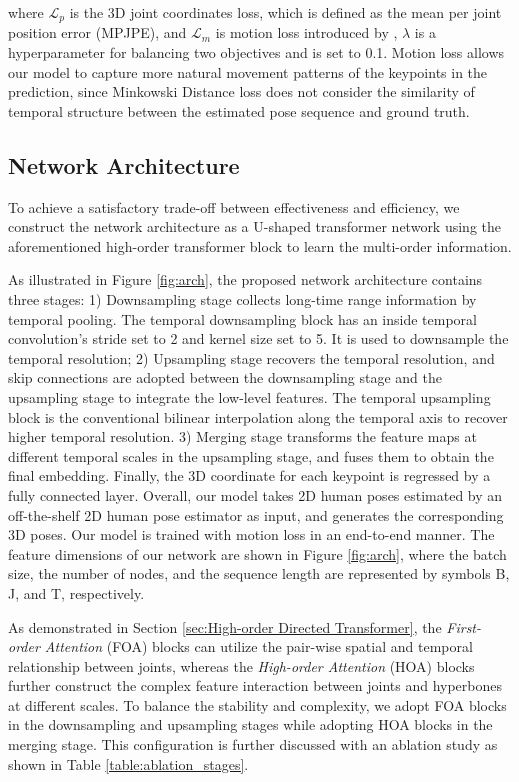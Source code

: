 \documentclass{article}
\begin{document}
\noindent where $\mathcal{L}_p$ is the 3D joint coordinates loss, which is defined as the mean per joint position error (MPJPE), and $\mathcal{L}_m$ is motion loss introduced by \cite{wang2020-motion}, $\lambda$ is a hyperparameter for balancing two objectives and is set to 0.1. Motion loss allows our model to capture more natural movement patterns of the keypoints in the prediction, since Minkowski Distance loss does not consider the similarity of temporal structure between the estimated pose sequence and ground truth. 



\subsection{Network Architecture}
To achieve a satisfactory trade-off between effectiveness and efficiency, we construct the network architecture as a U-shaped transformer network using the aforementioned high-order transformer block to learn the multi-order information. 

As illustrated in Figure \ref{fig:arch}, the proposed network architecture contains three stages: 1) Downsampling stage collects long-time range information by temporal pooling. The temporal downsampling block has an inside temporal convolution’s stride set to 2 and kernel size set to 5. It is used to downsample the temporal resolution; 2) Upsampling stage recovers the temporal resolution, and skip connections are adopted between the downsampling stage and the upsampling stage to integrate the low-level features. The temporal upsampling block is the conventional bilinear interpolation along the temporal axis to recover higher temporal resolution. 3) Merging stage transforms the feature maps at different temporal scales in the upsampling stage, and fuses them to obtain the final embedding. Finally, the 3D coordinate for each keypoint is regressed by a fully connected layer. Overall, our model takes 2D human poses estimated by an off-the-shelf 2D human pose estimator as input, and generates the corresponding 3D poses. Our model is trained with motion loss \cite{wang2020-motion} in an end-to-end manner. The feature dimensions of our network are shown in Figure \ref{fig:arch}, where the batch size, the number of nodes, and the sequence length are represented by symbols B, J, and T, respectively.

As demonstrated in Section \ref{sec:High-order Directed Transformer}, the \textit{First-order Attention} (FOA) blocks can utilize the pair-wise spatial and temporal relationship between joints, whereas the \textit{High-order Attention} (HOA) blocks further construct the complex feature interaction between joints and hyperbones at different scales. To balance the stability and complexity, we adopt FOA blocks in the downsampling and upsampling stages while adopting HOA blocks in the merging stage. This configuration is further discussed with an ablation study as shown in Table \ref{table:ablation_stages}.
\end{document}
